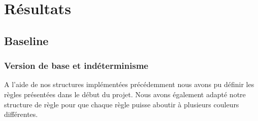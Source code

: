 \documentclass{article}
\begin{document}
\newpage
\section{Résultats}

    {
    
    \subsection{Baseline}
        {
        \subsubsection{Version de base et indéterminisme}
        {
        A l'aide de nos structures implémentées précédemment nous avons pu définir les règles présentées dans le début du projet. Nous avons également adapté notre structure de règle pour que chaque règle puisse aboutir à plusieurs couleurs différentes.
        
        }
    
}}
\end{document}
